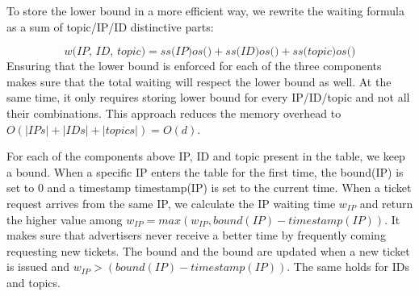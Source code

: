 To store the lower bound in a more efficient way, we rewrite the waiting formula as a sum of topic/IP/ID distinctive parts:

\begin{equation}
    \textit{w(IP, ID, topic)} = 
    \textit{ss(IP)}\textit{os()} + 
    \textit{ss(ID)}\textit{os()} + 
    \textit{ss(topic)}\textit{os()}
\end{equation}
Ensuring that the lower bound is enforced for each of the three components makes sure that the total waiting will respect the lower bound as well. At the same time, it only requires storing lower bound for every IP/ID/topic and not all their combinations. This approach reduces the memory overhead to $O(|IPs|+|IDs|+|topics|) = O(d)$.

For each of the components above IP, ID and topic present in the table, we keep a bound. When a specific IP enters the table for the first time, the bound(IP) is set to 0 and a timestamp timestamp(IP) is set to the current time. When a ticket request arrives from the same IP, we calculate the IP waiting time $w_{IP}$ and return the higher value among $w_{IP} = max(w_{IP}, bound(IP) - timestamp(IP))$. It makes sure that advertisers never receive a better time by frequently coming requesting new tickets. The bound and the bound are updated when a new ticket is issued and $w_{IP} > (bound(IP) - timestamp(IP))$. The same holds for IDs and topics.


